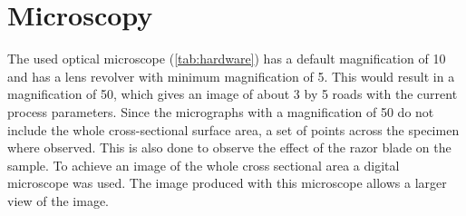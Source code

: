 \section{Microscopy}
The used optical microscope  (\ref{tab:hardware}) has a default magnification of 10 and has a lens revolver with minimum magnification of 5. This would result in a magnification of 50, which gives an image of about 3 by 5 roads with the current process parameters.
Since the micrographs with a magnification of 50 do not include the whole cross-sectional surface area, a set of points across the specimen where observed. This is also done to observe the effect of the razor blade on the sample.
To achieve an image of the whole cross sectional area a digital microscope was used. The image produced with this microscope allows a larger view of the image.




